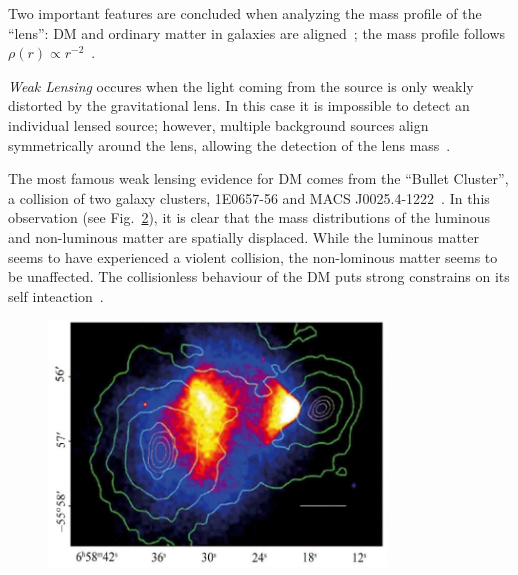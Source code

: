 \begin{figure}
\begin{minipage}[c]{0.4\textheight}
{%
        \label{subfig:QSO}}
    \end{minipage} 
\end{figure}

Two important features are concluded when analyzing the mass profile of the ``lens'': DM and ordinary matter in galaxies are aligned~\cite{Ferreras:2007na}; the mass profile follows $\rho(r)\propto r^{-2}$~\cite{Gavazzi:2007vw}. 

\textit{Weak Lensing} occures when the light coming from the source is only weakly distorted by the gravitational lens. In this case it is impossible to detect an individual lensed source; however, multiple background sources align symmetrically around the lens, allowing the detection of the lens mass~\cite{Kaiser:1992ps}.

The most famous weak lensing evidence for DM comes from the ``Bullet Cluster'', a collision of two galaxy clusters, 1E0657-56 and MACS J0025.4-1222~\cite{Clowe:2006eq}. In this observation (see Fig.~\ref{fig:Bullet}), it is clear that the mass distributions of the luminous and non-luminous matter are spatially displaced. While the luminous matter seems to have experienced a violent collision, the non-lominous matter seems to be unaffected. The collisionless behaviour of the DM puts strong constrains on its self inteaction~\cite{Randall:2007ph}. 

 \begin{figure}[]
	\centering
	\includegraphics[width=0.8\textwidth]{figs/bulletCluster.jpg}
	\label{fig:Bullet}
\end{figure}  



